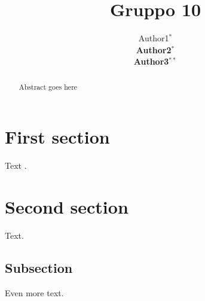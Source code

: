 \documentclass[a4paper,9pt,twoside]{article}
\begin{document}
\title{Gruppo 10}

\author{Author1$^*$ \\
{\normalsize \bf Author2}$^*$ \\
{\normalsize \bf Author3}$^{**}$ 
\AND {}
\AND {} }


\maketitle\thispagestyle{empty} %


\begin{abstract}
Abstract goes here
\end{abstract}

\section{First section}

Text \cite{Banko2001a}.

\section{Second section}

Text.

\subsection{Subsection}

Even more text.


 
  
\end{document}
